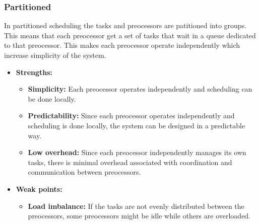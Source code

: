         \subsubsection*{\textbf{Partitioned}}
        In partitioned scheduling the tasks and preocessors are patitioned into groups. This means that each preocessor get a set of tasks that wait in a queue dedicated to that preocessor. This makes each preocessor operate independently which increase simplicity of the system.
        \begin{itemize}
            \item \textbf{Strengths:}
            \begin{itemize}
                \item \textbf{Simplicity:} Each preocessor operates independently and scheduling can be done locally.
                \item \textbf{Predictability:} Since each preocessor operates independently and scheduling is done locally, the system can be designed in a predictable way.
                \item \textbf{Low overhead:} Since each preocessor independently manages its own tasks, there is minimal overhead associated with coordination and communication between preocessors.
            \end{itemize}
            \item \textbf{Weak points:}
            \begin{itemize}
                \item \textbf{Load imbalance:} If the tasks are not evenly distributed between the preocessors, some preocessors might be idle while others are overloaded.
            \end{itemize}
        \end{itemize}

